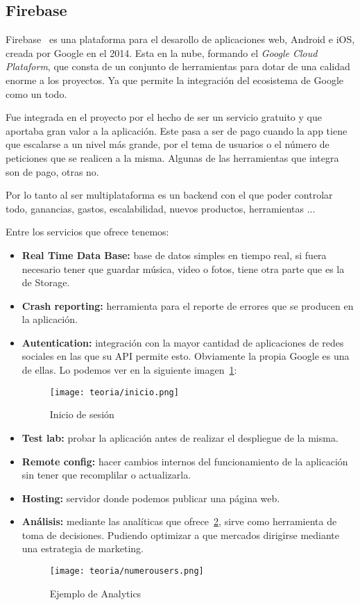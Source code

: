 \subsection{Firebase}
Firebase~\cite{wiki:firebase} es una plataforma para el desarollo de aplicaciones web, Android e iOS, creada por Google en el 2014. Esta en la nube, formando el \emph{Google Cloud Plataform}, que consta de un conjunto de herramientas para dotar de una calidad enorme a los proyectos. Ya que permite la integración del ecosistema de Google como un todo.

Fue integrada en el proyecto por el hecho de ser un servicio gratuito y que aportaba gran valor a la aplicación. Este pasa a ser de pago cuando la app tiene que escalarse a un nivel más grande, por el tema de usuarios o el número de peticiones que se realicen a la misma. Algunas de las herramientas que integra son de pago, otras no.

Por lo tanto al ser multiplataforma es un backend con el que poder controlar todo, ganancias, gastos, escalabilidad, nuevos productos, herramientas ... 

Entre los servicios que ofrece tenemos:

\begin{itemize}
	\item \textbf{Real Time Data Base:} base de datos simples en tiempo real, si fuera necesario tener que guardar música, video o fotos, tiene otra parte que es la de Storage.
	\item \textbf{Crash reporting:} herramienta para el reporte de errores que se producen en la aplicación.
	\item \textbf{Autentication:} integración con la mayor cantidad de aplicaciones de redes sociales en las que su API permite esto. Obviamente la propia Google es una de ellas. Lo podemos ver en la siguiente imagen~\ref{fig:inicio}:
	\begin{figure}[H]
		\centering
		\texttt{[image: teoria/inicio.png]}
		\caption{Inicio de sesión}\label{fig:inicio}
	\end{figure}
	\item \textbf{Test lab:} probar la aplicación antes de realizar el despliegue de la misma.
	\item \textbf{Remote config:} hacer cambios internos del funcionamiento de la aplicación sin tener que recomplilar o actualizarla.
	\item \textbf{Hosting:} servidor donde podemos publicar una página web.
	\item \textbf{Análisis:} mediante las analíticas que ofrece~\ref{fig:numerousers}, sirve como herramienta de toma de decisiones. Pudiendo optimizar a que mercados dirigirse mediante una estrategia de marketing.
	\begin{figure}[H]
		\centering
		\texttt{[image: teoria/numerousers.png]}
		\caption{Ejemplo de Analytics}\label{fig:numerousers}
	\end{figure}
\end{itemize}
